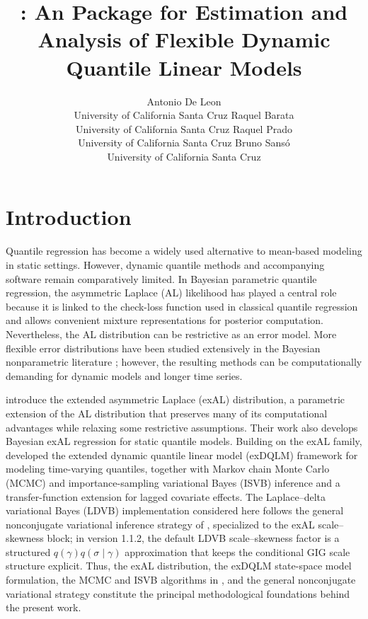 \documentclass{jss}
\author{Antonio De Leon \\ University of California Santa Cruz \And
        Raquel Barata \\ University of California Santa Cruz \AND
        Raquel Prado \\ University of California Santa Cruz \And
        Bruno Sans\'{o} \\ University of California Santa Cruz}
\title{\pkg{exdqlm}: An \proglang{R} Package for Estimation and Analysis of Flexible Dynamic Quantile Linear Models}
\begin{document}
\section{Introduction}

Quantile regression has become a widely used alternative to mean-based modeling in static settings. However, dynamic quantile methods and accompanying software remain comparatively limited. In Bayesian parametric quantile regression, the asymmetric Laplace (AL) likelihood has played a central role because it is linked to the check-loss function used in classical quantile regression \citep{yu2001bayesian,koenkerquantile} and allows convenient mixture representations for posterior computation. Nevertheless, the AL distribution can be restrictive as an error model. More flexible error distributions have been studied extensively in the Bayesian nonparametric literature \citep{kottas2009bayesian,reich2009flexible,taddy2010bayesian}; however, the resulting methods can be computationally demanding for dynamic models and longer time series.

\citet{yan2025family} introduce the extended asymmetric Laplace (exAL) distribution, a parametric extension of the AL distribution that preserves many of its computational advantages while relaxing some restrictive assumptions. Their work also develops Bayesian exAL regression for static quantile models. Building on the exAL family, \citet{me} developed the extended dynamic quantile linear model (exDQLM) framework for modeling time-varying quantiles, together with Markov chain Monte Carlo (MCMC) and importance-sampling variational Bayes (ISVB) inference and a transfer-function extension for lagged covariate effects. The Laplace--delta variational Bayes (LDVB) implementation considered here follows the general nonconjugate variational inference strategy of \citet{wang2013nonconjugatevb}, specialized to the exAL scale--skewness block; in version 1.1.2, the default LDVB scale--skewness factor is a structured \(q(\gamma)q(\sigma\mid\gamma)\) approximation that keeps the conditional GIG scale structure explicit. Thus, the exAL distribution, the exDQLM state-space model formulation, the MCMC and ISVB algorithms in \citet{me}, and the general nonconjugate variational strategy constitute the principal methodological foundations behind the present work.
\end{document}
